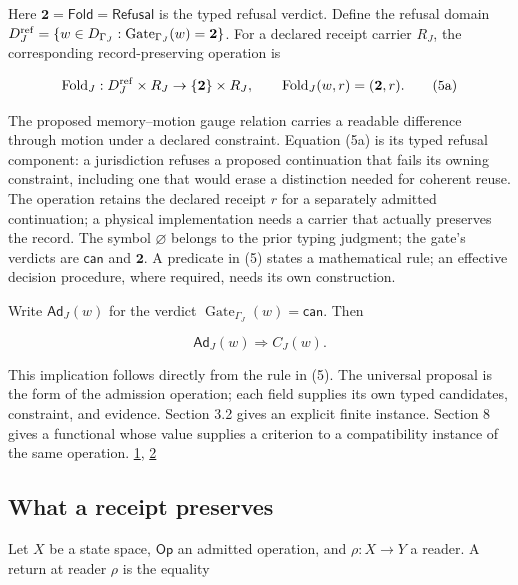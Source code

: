 Here \(\mathbf 2=\mathsf{Fold}=\mathsf{Refusal}\) is the typed refusal verdict. Define the refusal domain \(D_J^{\rm ref}=\{w\in D_{\Gamma_J}:\operatorname{Gate}_{\Gamma_J}(w)=\mathbf 2\}\). For a declared receipt carrier \(R_J\), the corresponding record-preserving operation is

\[
\operatorname{Fold}_J:D_J^{\rm ref}\times R_J\to\{\mathbf 2\}\times R_J,
\qquad \operatorname{Fold}_J(w,r)=(\mathbf 2,r).
\tag{5a}
\]

The proposed memory--motion gauge relation carries a readable difference through motion under a declared constraint. Equation (5a) is its typed refusal component: a jurisdiction refuses a proposed continuation that fails its owning constraint, including one that would erase a distinction needed for coherent reuse. The operation retains the declared receipt \(r\) for a separately admitted continuation; a physical implementation needs a carrier that actually preserves the record. The symbol \(\varnothing\) belongs to the prior typing judgment; the gate's verdicts are \(\mathsf{can}\) and \(\mathbf 2\). A predicate in (5) states a mathematical rule; an effective decision procedure, where required, needs its own construction.

Write \(\mathsf{Ad}_J(w)\) for the verdict \(\operatorname{Gate}_{\Gamma_J}(w)=\mathsf{can}\). Then

\[
\mathsf{Ad}_J(w)\Longrightarrow C_J(w).
\tag{6}
\]

This implication follows directly from the rule in (5). The universal proposal is the form of the admission operation; each field supplies its own typed candidates, constraint, and evidence. Section 3.2 gives an explicit finite instance. Section 8 gives a functional whose value supplies a criterion to a compatibility instance of the same operation. \href{https://github.com/Coppalini-Architecture/coppalini-architecture/blob/9b7122ca5c3712c2c294e2bc5097276d0ba9817b/papers/language-mechanics/000-language-mechanics/language-mechanics-000-v0.2.1.pdf}{1}, \href{https://doi.org/10.5281/zenodo.23697265}{2}

\hypertarget{what-a-receipt-preserves}{%
\subsection{What a receipt preserves}\label{what-a-receipt-preserves}}

Let \(X\) be a state space, \(\mathsf{Op}\) an admitted operation, and \(\rho:X\to Y\) a reader. A return at reader \(\rho\) is the equality

